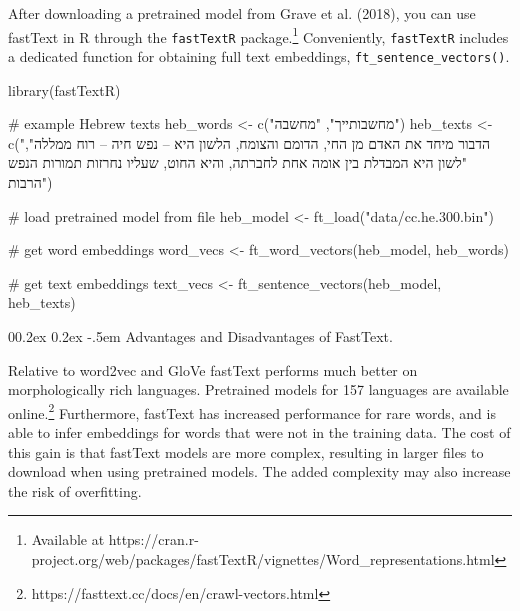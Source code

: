 \documentclass[
  man,
  floatsintext,
  longtable,
  nolmodern,
  notxfonts,
  notimes,
  colorlinks=true,linkcolor=blue,citecolor=blue,urlcolor=blue]{apa7}
\makeatletter
\renewcommand{\paragraph}{\@startsection{paragraph}{4}{\parindent}%
	{0\baselineskip \@plus 0.2ex \@minus 0.2ex}%
	{-.5em}%
	{\normalfont\normalsize\bfseries\typesectitle}}
\newenvironment{Shaded}{\begin{snugshade}}{\end{snugshade}}
\newcommand{\CommentTok}[1]{\textcolor[rgb]{0.37,0.37,0.37}{#1}}
\newcommand{\FunctionTok}[1]{\textcolor[rgb]{0.28,0.35,0.67}{#1}}
\newcommand{\NormalTok}[1]{\textcolor[rgb]{0.00,0.23,0.31}{#1}}
\newcommand{\OtherTok}[1]{\textcolor[rgb]{0.00,0.23,0.31}{#1}}
\newcommand{\StringTok}[1]{\textcolor[rgb]{0.13,0.47,0.30}{#1}}
\makeatother
\begin{document}
After downloading a pretrained model from Grave et al. (2018), you can
use fastText in R through the \texttt{fastTextR} package.\footnote{Available
  at
  https://cran.r-project.org/web/packages/fastTextR/vignettes/Word\_representations.html}
Conveniently, \texttt{fastTextR} includes a dedicated function for
obtaining full text embeddings, \texttt{ft\_sentence\_vectors()}.

\begin{Shaded}
\begin{Highlighting}[]
\FunctionTok{library}\NormalTok{(fastTextR)}

\CommentTok{\# example Hebrew texts}
\NormalTok{heb\_words }\OtherTok{\textless{}{-}} \FunctionTok{c}\NormalTok{(}\StringTok{"מחשבותייך"}\NormalTok{, }\StringTok{"מחשבה"}\NormalTok{)}
\NormalTok{heb\_texts }\OtherTok{\textless{}{-}} \FunctionTok{c}\NormalTok{(}\StringTok{"הדבור מיחד את האדם מן החי, הדומם והצומח, הלשון היא – נפש חיה – רוח ממללה"}\NormalTok{, }\StringTok{"לשון היא המבדלת בין אומה אחת לחברתה, והיא החוט, שעליו נחרזות תמורות הנפש הרבות"}\NormalTok{)}

\CommentTok{\# load pretrained model from file}
\NormalTok{heb\_model }\OtherTok{\textless{}{-}} \FunctionTok{ft\_load}\NormalTok{(}\StringTok{"data/cc.he.300.bin"}\NormalTok{)}

\CommentTok{\# get word embeddings}
\NormalTok{word\_vecs }\OtherTok{\textless{}{-}} \FunctionTok{ft\_word\_vectors}\NormalTok{(heb\_model, heb\_words)}

\CommentTok{\# get text embeddings}
\NormalTok{text\_vecs }\OtherTok{\textless{}{-}} \FunctionTok{ft\_sentence\_vectors}\NormalTok{(heb\_model, heb\_texts)}
\end{Highlighting}
\end{Shaded}

\paragraph{Advantages and Disadvantages of
FastText.}\label{advantages-and-disadvantages-of-fasttext}

Relative to word2vec and GloVe fastText performs much better on
morphologically rich languages. Pretrained models for 157 languages are
available online.\footnote{https://fasttext.cc/docs/en/crawl-vectors.html}
Furthermore, fastText has increased performance for rare words, and is
able to infer embeddings for words that were not in the training data.
The cost of this gain is that fastText models are more complex,
resulting in larger files to download when using pretrained models. The
added complexity may also increase the risk of overfitting.
\end{document}
